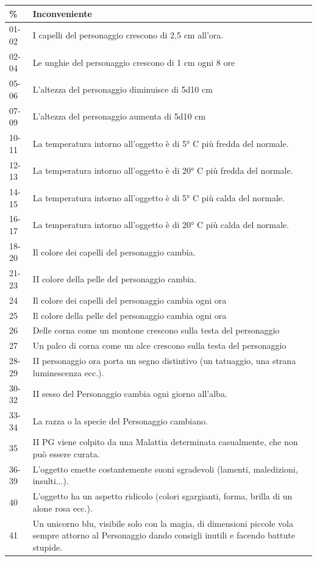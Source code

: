 {\small
\begin{tabularx}{0.95\textwidth}{lX}
\textbf{\%} & \textbf{Inconveniente}\\
\toprule
01-02& I capelli del personaggio crescono di 2,5 cm all'ora.\\
02-04& Le unghie del personaggio crescono di 1 cm ogni 8 ore\\
05-06   & L'altezza del personaggio diminuisce di 5d10 cm \\
07-09   & L'altezza del personaggio aumenta di 5d10 cm \\
10-11   & La temperatura intorno all'oggetto è di 5° C più fredda del normale.\\
12-13   & La temperatura intorno all'oggetto è di 20° C più fredda del normale.\\
14-15   & La temperatura intorno all'oggetto è di 5° C più calda del normale.\\
16-17   & La temperatura intorno all'oggetto è di 20° C più calda del normale.\\
18-20   & Il colore dei capelli del personaggio cambia.\\
21-23   & II colore della pelle del personaggio cambia.\\
24& Il colore dei capelli del personaggio cambia ogni ora\\
25& Il colore della pelle del personaggio cambia ogni ora\\
26      & Delle corna come un montone crescono sulla testa del personaggio\\
27      & Un palco di corna come un alce crescono sulla testa del personaggio\\
28-29   & II personaggio ora porta un segno distintivo (un tatuaggio, una strana luminescenza ecc.).\\
30-32   & II sesso del Personaggio cambia ogni giorno all'alba.\\
33-34   & La razza o la specie del Personaggio cambiano.\\
35      & II PG viene colpito da una Malattia determinata casualmente, che non può essere curata.\\
36-39   & L'oggetto emette costantemente suoni sgradevoli (lamenti, maledizioni, insulti...).\\
40      & L'oggetto ha un aspetto ridicolo (colori sgargianti, forma, brilla di un alone rosa ecc.).\\
41      & Un unicorno blu, visibile solo con la magia, di dimensioni piccole vola sempre attorno al Personaggio dando consigli inutili e facendo battute stupide.\\

\end{tabularx}}
